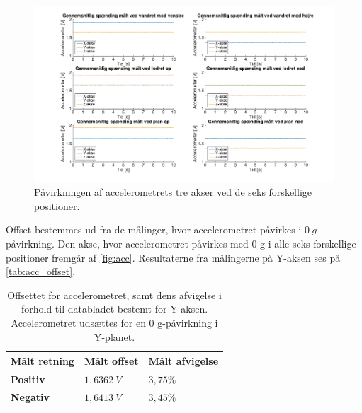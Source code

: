 \begin{figure}[H]
\centering
\includegraphics[width=1\textwidth]{figures/paavirkning}
\caption{Påvirkningen af accelerometrets tre akser ved de seks forskellige positioner.}
\label{fig:acc_paavirkning2}
\end{figure}

\noindent
Offset bestemmes ud fra de målinger, hvor accelerometret påvirkes i $0~g$-påvirkning. Den akse, hvor accelerometret påvirkes med 0 g i alle seks forskellige positioner fremgår af \autoref{fig:acc}. Resultaterne fra målingerne på Y-aksen ses på \autoref{tab:acc_offset}. 

\begin{table}[H]
	\centering
	\begin{tabular}{|l|l|l|} \hline
\textbf{Målt retning} & \textbf{Målt offset} & \textbf{Målt afvigelse} \\ \hline
    \textbf{Positiv} 			& $1,6362~V$	& $3,75 \%$    \\ \hline
    \textbf{Negativ} 			& $1,6413~V$	& $3,45 \%$	\\ \hline
	\end{tabular}
	\caption{Offsettet for accelerometret, samt dens afvigelse i forhold til databladet bestemt for Y-aksen. Accelerometret udsættes for en 0 g-påvirkning i Y-planet.}
	\label{tab:acc_offset}
\end{table}

